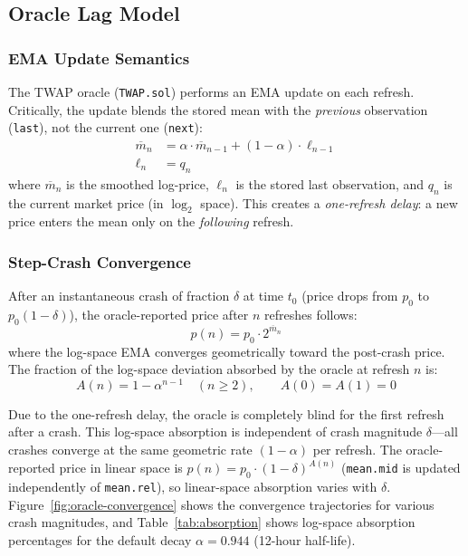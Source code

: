 \documentclass[10pt,a4paper,twocolumn]{article}
\begin{document}
\subsection{Oracle Lag Model}
\label{sec:bd-oracle-lag}

\subsubsection{EMA Update Semantics}
\label{subsec:bd-ema}

The TWAP oracle (\texttt{TWAP.sol}) performs an EMA update on each refresh. Critically, the update blends the stored mean with the \emph{previous} observation (\texttt{last}), not the current one (\texttt{next}):
\begin{align}
\overline{m}_n &= \alpha \cdot \overline{m}_{n-1} + (1{-}\alpha) \cdot \ell_{n-1} \label{eq:ema-update} \\
\ell_n &= q_n \label{eq:last-update}
\end{align}
where $\overline{m}_n$ is the smoothed log-price, $\ell_n$ is the stored last observation, and $q_n$ is the current market price (in $\log_2$ space). This creates a \emph{one-refresh delay}: a new price enters the mean only on the \emph{following} refresh.

\subsubsection{Step-Crash Convergence}
\label{subsec:bd-step-crash}

After an instantaneous crash of fraction $\delta$ at time $t_0$ (price drops from $p_0$ to $p_0(1{-}\delta)$), the oracle-reported price after $n$ refreshes follows:
\begin{equation}
\label{eq:oracle-trajectory}
\hat{p}(n) = p_0 \cdot 2^{\overline{m}_n}
\end{equation}
where the log-space EMA converges geometrically toward the post-crash price. The fraction of the log-space deviation absorbed by the oracle at refresh $n$ is:
\begin{equation}
\label{eq:absorption}
A(n) = 1 - \alpha^{n-1} \quad (n \geq 2), \qquad A(0) = A(1) = 0
\end{equation}

Due to the one-refresh delay, the oracle is completely blind for the first refresh after a crash. This log-space absorption is independent of crash magnitude $\delta$---all crashes converge at the same geometric rate $(1{-}\alpha)$ per refresh. The oracle-reported price in linear space is $\hat{p}(n) = p_0 \cdot (1{-}\delta)^{A(n)}$ (\texttt{mean.mid} is updated independently of \texttt{mean.rel}), so linear-space absorption varies with $\delta$. Figure~\ref{fig:oracle-convergence} shows the convergence trajectories for various crash magnitudes, and Table~\ref{tab:absorption} shows log-space absorption percentages for the default decay $\alpha = 0.944$ (12-hour half-life).
\end{document}
